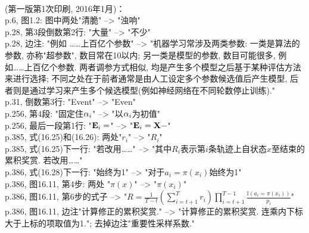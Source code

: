 \documentclass[UTF8]{article}
\begin{document}
\\
(第一版第1次印刷, 2016年1月)：
\\
p.6, 图1.2: 图中两处"清脆" --> "浊响" \\
p.28, 第3段倒数第2行: "大量" --> "不少" \\
p.28, 边注: "例如 ……上百亿个参数" --> "机器学习常涉及两类参数: 一类是算法的参数, 亦称"超参数", 数目常在10以内; 另一类是模型的参数, 数目可能很多, 例如……上百亿个参数. 两者调参方式相似, 均是产生多个模型之后基于某种评估方法来进行选择; 不同之处在于前者通常是由人工设定多个参数候选值后产生模型, 后者则是通过学习来产生多个候选模型(例如神经网络在不同轮数停止训练)." \\
p.31, 倒数第3行: "Event" --> "Even" \\
p.256, 第4段: "固定住${\bf \alpha}_i$" --> "以${\bf \alpha}_i$为初值" \\
p.256, 最后一段第1行: "${\bf E}_i =$" --> "${\bf E}_i = {\bf X} - $" \\
p.385, 式(16.25)和(16.26): 两处"$r_i$" --> "$R_i$" \\
p.385, 式(16.25)下一行: "若改用……" --> "其中$R_i$表示第$i$条轨迹上自状态$x$至结束的累积奖赏. 若改用……" \\
p.386, 式(16.28)下一行: "始终为1" --> "对于$a_i=\pi(x_i)$始终为1" \\
p.386, 图16.11, 第4步: 两处 "$\pi(x)$" --> "$\pi(x_i)$" \\
p.386, 图16.11, 第6步的式子 --> "$R=\frac{1}{T-t}\left(\sum_{i=t+1}^T r_i\right) \prod_{i=t+1}^{T-1} \frac{\mathbb I(a_i=\pi(x_i))}{p_i}$" \\
p.386, 图16.11, 边注"计算修正的累积奖赏." --> "计算修正的累积奖赏. 连乘内下标大于上标的项取值为1."; 去掉边注"重要性采样系数." \\
\\
\end{document}
